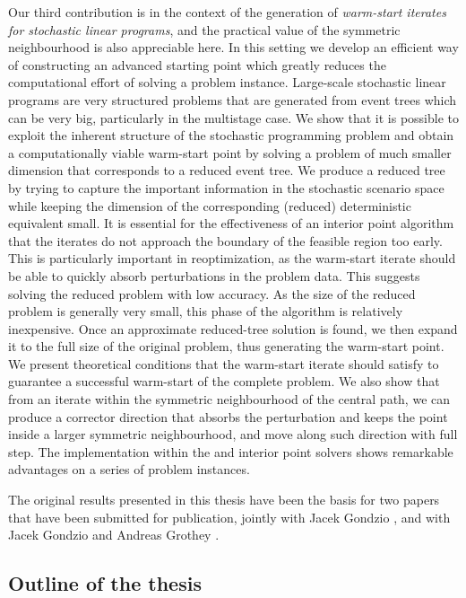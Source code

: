 Our third contribution is in the context of the generation of 
{\em warm-start iterates for stochastic linear programs}, 
and the practical value of the 
symmetric neighbourhood is also appreciable here.
In this setting we develop an efficient way of constructing 
an advanced starting point which greatly reduces the computational
effort of solving a problem instance.
Large-scale stochastic linear programs are very structured problems
that are generated from event trees which can be very big, particularly
in the multistage case.
We show that it is possible to exploit the inherent structure of 
the stochastic programming problem and obtain a computationally viable
warm-start point by solving a problem of much smaller
dimension that corresponds to a reduced event tree.
We produce a reduced tree by trying to capture the 
important information in the stochastic scenario space while keeping 
the dimension of the corresponding (reduced) deterministic equivalent small.
It is essential for the effectiveness of an interior point algorithm
that the iterates do not approach the boundary of the
feasible region too early.
This is particularly important in reoptimization, 
as the warm-start iterate should be able to quickly absorb
perturbations in the problem data.
This suggests solving the reduced problem with low accuracy.
As the size of the reduced problem is generally very small,
this phase of the algorithm is relatively inexpensive.
Once an approximate reduced-tree solution is found,
we then expand it to the full size of
the original problem, thus generating the warm-start point.
We present theoretical conditions that the warm-start iterate
should satisfy to guarantee a successful warm-start of the complete 
problem. 
We also show that from an iterate within the symmetric neighbourhood
of the central path, we can produce
a corrector direction that absorbs the perturbation and 
keeps the point inside a larger symmetric neighbourhood,
and move along such direction with full step.
The implementation within the \HOPDM and \OOPS interior point solvers 
shows remarkable advantages on a series of problem instances.

The original results presented in this thesis have been the basis for two
papers that have been submitted for publication, jointly with
Jacek Gondzio \cite{ColomboGondzio05}, and with Jacek Gondzio and 
Andreas Grothey \cite{ColomboGondzioGrothey06}.

%
%
\subsection*{Outline of the thesis}

